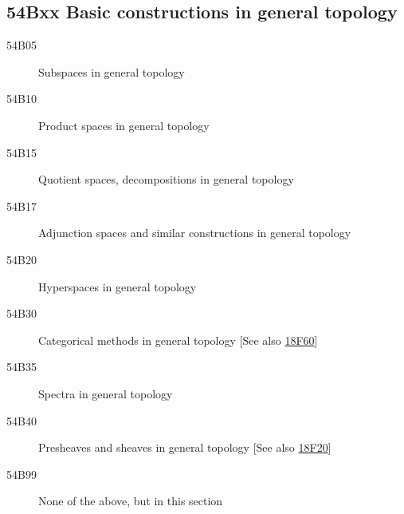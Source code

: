\subsection*{54Bxx  Basic constructions in general topology}\label{54Bxx}
\begin{description}  
\item [54B05]\label{54B05} Subspaces in general topology
\item [54B10]\label{54B10} Product spaces  in general topology
\item [54B15]\label{54B15} Quotient spaces, decompositions in general topology
\item [54B17]\label{54B17} Adjunction spaces and similar constructions in general topology
\item [54B20]\label{54B20} Hyperspaces in general topology
\item [54B30]\label{54B30} Categorical methods in general topology [See also \hyperref[18F60]{18F60}]
\item [54B35]\label{54B35} Spectra in general topology
\item [54B40]\label{54B40} Presheaves and sheaves in general topology [See also \hyperref[18F20]{18F20}]
\item [54B99]\label{54B99} None of the above, but in this section
\end{description}
